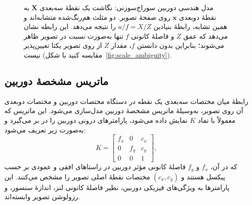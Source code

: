 \begin{figure}[htbp]
    \caption[مدل هندسی دوربین سوراخ‌سوزنی]{مدل هندسی دوربین سوراخ‌سوزنی:
    نگاشت یک نقطهٔ سه‌بعدی $\mathbf{X}$ به نقطهٔ دوبعدی $\mathbf{x}$ روی صفحهٔ
    تصویر. دو مثلث هم‌رنگ‌شده متشابه‌اند و همین تشابه، رابطهٔ بنیادین
    $u/f = X/Z$ را نتیجه می‌دهد. این رابطه نشان می‌دهد که عمق $Z$ و فاصلهٔ
    کانونی $f$ تنها به‌صورت \emph{نسبت} در تصویر ظاهر می‌شوند؛ بنابراین
    بدون دانستن $f$، مقدار $Z$ از روی تصویر یکتا تعیین‌پذیر نیست
    (مقایسه کنید با شکل~\ref{fig:scale_ambiguity}).}
    \label{fig:pinhole_model}
\end{figure}

\subsection{ماتریس مشخصهٔ دوربین}

رابطهٔ میان مختصات سه‌بعدی یک نقطه در دستگاه مختصات دوربین و مختصات دوبعدی آن روی تصویر، به‌وسیلهٔ ماتریس مشخصهٔ دوربین مدل‌سازی می‌شود. این ماتریس که معمولاً با نماد $K$ نمایش داده می‌شود، پارامترهای درونی دوربین را در بر می‌گیرد و به‌صورت زیر تعریف می‌شود:
\begin{equation}
K =
\begin{bmatrix}
f_x & 0   & c_x \\
0   & f_y & c_y \\
0   & 0   & 1
\end{bmatrix},
\end{equation}
که در آن، $f_x$ و $f_y$ فاصلهٔ کانونی مؤثر دوربین در راستاهای افقی و عمودی بر حسب پیکسل هستند و $(c_x, c_y)$ مختصات نقطهٔ اصلی تصویر را مشخص می‌کنند. این پارامترها به ویژگی‌های فیزیکی دوربین، نظیر فاصلهٔ کانونی لنز، اندازهٔ سنسور، و رزولوشن تصویر وابسته‌اند.

